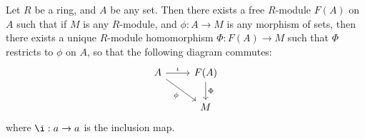 \begin{theorem}\label{theorem_4.4.4}
  Let $R$ be a ring, and  $A$ be any set. Then there exists a free
  $R$-module $F(A)$ on $A$ such that if  $M$ is any  $R$-module, and
  $\phi:A \xrightarrow{} M$ is any morphism of sets, then there exists
  a unique $R$-module homomorphism $\Phi:F(A) \xrightarrow{} M$ such
  that $\Phi$ restricts to $\phi$ on $A$, so that the following
  diagram commutes:
  \[\begin{tikzcd}
    A & {F(A)} \\
      & M
      \arrow["\iota", from=1-1, to=1-2]
      \arrow["\phi"', from=1-1, to=2-2]
      \arrow["\Phi", from=1-2, to=2-2]
  \end{tikzcd}\]
  where $\i:a \xrightarrow{} a$ is the inclusion map.
\end{theorem}
